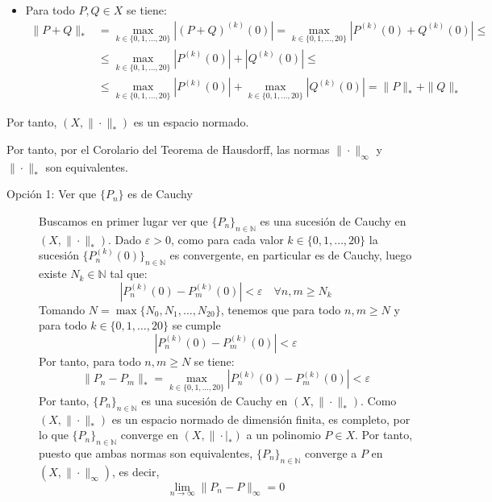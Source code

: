 \documentclass[12pt]{article}
\begin{document}
\begin{ejercicio}[3 puntos]
\begin{itemize}
\begin{itemize}
                \item Para todo $P,Q\in X$ se tiene:
                \begin{align*}
                    \|P+Q\|_* &= \max_{k\in\{0,1,\ldots,20\}} |(P+Q)^{(k)}(0)| = \max_{k\in\{0,1,\ldots,20\}} |P^{(k)}(0) + Q^{(k)}(0)| \leq \\ &\leq \max_{k\in\{0,1,\ldots,20\}} |P^{(k)}(0)| + |Q^{(k)}(0)| \leq \\&\leq \max_{k\in\{0,1,\ldots,20\}} |P^{(k)}(0)| + \max_{k\in\{0,1,\ldots,20\}} |Q^{(k)}(0)| = \|P\|_* + \|Q\|_*
                \end{align*}
            \end{itemize}

            Por tanto, $\left(X,\|\cdot\|_*\right)$ es un espacio normado.
        \end{itemize}

        Por tanto, por el Corolario del Teorema de Hausdorff, las normas $\|\cdot\|_\infty$ y $\|\cdot\|_*$ son equivalentes.
        \begin{description}
            \item[Opción 1: Ver que $\{P_n\}$ es de Cauchy] 
            
            Buscamos en primer lugar ver que $\{P_n\}_{n\in \mathbb{N}}$ es una sucesión de Cauchy en $\left(X,\|\cdot\|_*\right)$. Dado $\varepsilon>0$, como para cada valor $k\in\{0,1,\ldots,20\}$ la sucesión $\{P_n^{(k)}(0)\}_{n\in \mathbb{N}}$ es convergente, en particular es de Cauchy, luego existe $N_k\in \mathbb{N}$ tal que:
            \begin{equation*}
                |P_n^{(k)}(0)-P_m^{(k)}(0)|<\varepsilon \quad \forall n,m\ge N_k
            \end{equation*}
            Tomando $N=\max\{N_0,N_1,\ldots,N_{20}\}$, tenemos que para todo $n,m\ge N$ y para todo $k\in\{0,1,\ldots,20\}$ se cumple
            \begin{equation*}
                |P_n^{(k)}(0)-P_m^{(k)}(0)|<\varepsilon
            \end{equation*}
            Por tanto, para todo $n,m\ge N$ se tiene:
            \begin{equation*}
                \|P_n-P_m\|_* = \max_{k\in\{0,1,\ldots,20\}} |P_n^{(k)}(0)-P_m^{(k)}(0)|<\varepsilon
            \end{equation*}
            Por tanto, $\{P_n\}_{n\in \mathbb{N}}$ es una sucesión de Cauchy en $\left(X,\|\cdot\|_*\right)$. Como $\left(X,\|\cdot\|_*\right)$ es un espacio normado de dimensión finita, es completo, por lo que $\{P_n\}_{n\in \mathbb{N}}$ converge en $\left(X,\|\cdot|_*\right)$ a un polinomio $P\in X$. Por tanto, puesto que ambas normas son equivalentes, $\{P_n\}_{n\in \mathbb{N}}$ converge a $P$ en $\left(X,\|\cdot\|_\infty\right)$, es decir,
            \begin{equation*}
                \lim_{n\to\infty} \|P_n-P\|_\infty = 0
            \end{equation*}


\end{description}
\end{ejercicio}
\end{document}
